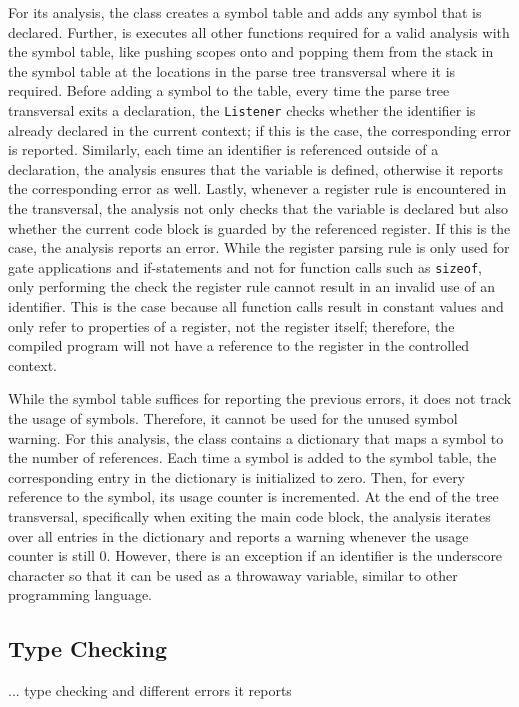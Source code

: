 For its analysis, the class creates a symbol table and adds any symbol that is declared. Further, is executes all other functions required for a valid analysis with the symbol table, like pushing scopes onto and popping them from the stack in the symbol table at the locations in the parse tree transversal where it is required. Before adding a symbol to the table, \ie every time the parse tree transversal exits a declaration, the \texttt{Listener} checks whether the identifier is already declared in the current context; if this is the case, the corresponding error is reported. Similarly, each time an identifier is referenced outside of a declaration, the analysis ensures that the variable is defined, otherwise it reports the corresponding error as well. Lastly, whenever a register rule is encountered in the transversal, the analysis not only checks that the variable is declared but also whether the current code block is guarded by the referenced register. If this is the case, the analysis reports an error. While the register parsing rule is only used for gate applications and if-statements and not for function calls such as \texttt{sizeof}, only performing the check the register rule cannot result in an invalid use of an identifier. This is the case because all function calls result in constant values and only refer to properties of a register, not the register itself; therefore, the compiled program will not have a reference to the register in the controlled context.

While the symbol table suffices for reporting the previous errors, it does not track the usage of symbols. Therefore, it cannot be used for the unused symbol warning. For this analysis, the class contains a dictionary that maps a symbol to the number of references. Each time a symbol is added to the symbol table, the corresponding entry in the dictionary is initialized to zero. Then, for every reference to the symbol, its usage counter is incremented. At the end of the tree transversal, specifically when exiting the main code block, the analysis iterates over all entries in the dictionary and reports a warning whenever the usage counter is still $0$. However, there is an exception if an identifier is the underscore character so that it can be used as a throwaway variable, similar to other programming language.  

\subsection{Type Checking}
\label{sec:implementation_typeCheckingAnalayis}
... type checking and different errors it reports

